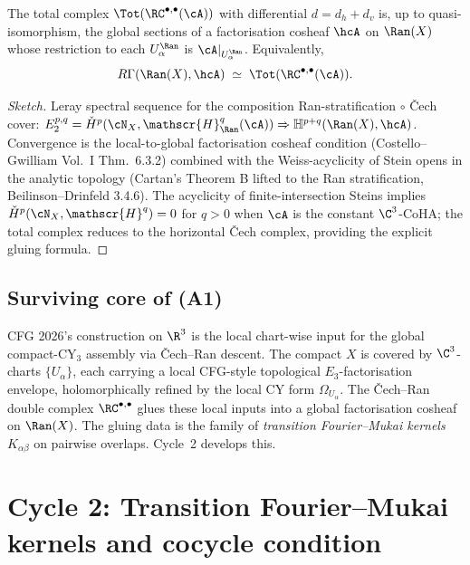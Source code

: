 \begin{proposition}
\label{prop:cech-ran-total}
The total complex $\Tot(\RC^{\bullet, \bullet}(\cA))$ with differential
$d = d_h + d_v$ is, up to quasi-isomorphism, the global sections of a
factorisation cosheaf $\hcA$ on $\Ran(X)$ whose restriction to each
$U_\alpha^{\Ran}$ is $\cA|_{U_\alpha^{\Ran}}$. Equivalently,
\[
  R\Gamma(\Ran(X), \hcA) \;\simeq\;
  \Tot(\RC^{\bullet, \bullet}(\cA)).
\]
\end{proposition}

\begin{proof}[Sketch]
Leray spectral sequence for the composition Ran-stratification $\circ$
Čech cover:
$E_2^{p,q} = \check H^p(\cN_X, \mathscr{H}^q_{\Ran}(\cA))
\Rightarrow \mathbb{H}^{p+q}(\Ran(X), \hcA)$. Convergence is the
local-to-global factorisation cosheaf condition (Costello--Gwilliam
Vol.~I Thm.~6.3.2) combined with the Weiss-acyclicity of Stein opens
in the analytic topology (Cartan's Theorem B lifted to the Ran
stratification, Beilinson--Drinfeld 3.4.6). The acyclicity of
finite-intersection Steins implies $\check H^p(\cN_X, \mathscr{H}^q) = 0$
for $q > 0$ when $\cA$ is the constant $\C^3$-CoHA; the total complex
reduces to the horizontal \v{C}ech complex, providing the explicit
gluing formula.
\end{proof}

\subsection*{Surviving core of (A1)}

CFG 2026's construction on $\R^3$ is the local chart-wise input for
the global compact-CY$_3$ assembly via Čech--Ran descent. The compact
$X$ is covered by $\C^3$-charts $\{U_\alpha\}$, each carrying
a local CFG-style topological $E_3$-factorisation envelope, holomorphically
refined by the local CY form $\Omega_{U_\alpha}$. The Čech--Ran double
complex $\RC^{\bullet, \bullet}$ glues these local inputs into a
global factorisation cosheaf on $\Ran(X)$. The gluing data is the
family of \emph{transition Fourier--Mukai kernels} $K_{\alpha\beta}$
on pairwise overlaps. Cycle~2 develops this.

\section{Cycle 2: Transition Fourier--Mukai kernels and cocycle
condition}

